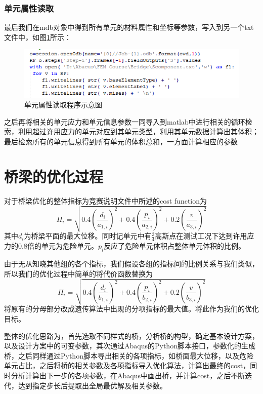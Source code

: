 \documentclass[forprint]{WHUBachelor}
\begin{document}
\subsection{单元属性读取}

最后我们在mdb对象中得到所有单元的材料属性和坐标等参数，写入到另一个txt文件中，如图\ref{4-6}所示：

\begin{figure}[H]
\centering  
\includegraphics[width = .8\textwidth]{5.png} 
\caption{单元属性读取程序示意图} 
\label{4-6} 
\end{figure}

之后再将相关的单元应力和单元信息参数一同导入到matlab中进行相关的循环检索，利用超过许用应力的单元对应到其单元类型，利用其单元数据计算出其体积；最后检索所有的单元信息得到所有单元的体积总和，一方面计算相应的参数

\chapter{桥梁的优化过程}
对于桥梁优化的整体指标为竞赛说明文件中所述的cost function为
\begin {equation} 
\Pi_{i}=\sqrt{0.4\left(\frac{d_{i}}{a_{1, i}}\right)^{2}+0.4\left(\frac{p_{i}}{a_{2, i}}\right)^{2}+0.2\left(\frac{v}{a_{3, i}}\right)^{2}}
 \end {equation}
其中$d_i$为桥梁平面的最大位移。同时记单元中有$\frac{3}{4}$高斯点在测试工况下达到许用应力的0.8倍的单元为危险单元。$p_i$反应了危险单元体积占整体单元体积的比例。\par
由于无从知晓其他组的各个指标，我们假设各组的指标间的比例关系与我们类似，所以我们的优化过程中简单的将代价函数替换为
\begin {equation} 
\Pi_{i}=\sqrt{0.4\left(\frac{d_{i}}{b_{1, i}}\right)^{2}+0.4\left(\frac{p_{i}}{b_{2, i}}\right)^{2}+0.2\left(\frac{v}{b_{3, i}}\right)^{2}}
 \end {equation}
将原有的分母部分改成遗传算法中出现的分项指标的最大值。将此作为我们的优化目标。\par
整体的优化思路为，首先选取不同样式的桥，分析桥的构型，确定基本设计方案，以及设计方案中的可变参数，其次通过Abaqus的Python脚本接口，参数化的生成桥，之后同样通过Python脚本导出相关的各项指标，如桥面最大位移，以及危险单元占比，之后将桥的相关参数及各项指标导入优化算法，计算出最终的cost，同时分析计算出下一步的各项参数，在Abaqus中画出桥，并计算cost，之后不断迭代，达到指定步长后提取出全局最优解及相关参数。
\end{document}
